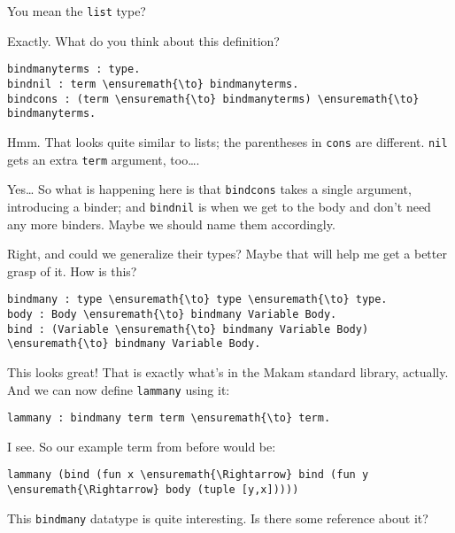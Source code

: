 \heroSTUDENT{} You mean the \texttt{list} type?

\heroADVISOR{} Exactly. What do you think about this definition?

\begin{verbatim}
bindmanyterms : type.
bindnil : term \ensuremath{\to} bindmanyterms.
bindcons : (term \ensuremath{\to} bindmanyterms) \ensuremath{\to} bindmanyterms.
\end{verbatim}

\heroSTUDENT{} Hmm. That looks quite similar to lists; the parentheses in
\texttt{cons} are different. \texttt{nil} gets an extra \texttt{term}
argument, too\ldots{}.

\heroADVISOR{} Yes\ldots{} So what is happening here is that \texttt{bindcons}
takes a single argument, introducing a binder; and \texttt{bindnil} is
when we get to the body and don't need any more binders. Maybe we should
name them accordingly.

\heroSTUDENT{} Right, and could we generalize their types? Maybe that will
help me get a better grasp of it. How is this?

\importantCodeblock{}

\begin{verbatim}
bindmany : type \ensuremath{\to} type \ensuremath{\to} type.
body : Body \ensuremath{\to} bindmany Variable Body.
bind : (Variable \ensuremath{\to} bindmany Variable Body) \ensuremath{\to} bindmany Variable Body.
\end{verbatim}

\importantCodeblockEnd{}

\heroADVISOR{} This looks great! That is exactly what's in the Makam standard
library, actually. And we can now define \texttt{lammany} using it:

\importantCodeblock{}

\begin{verbatim}
lammany : bindmany term term \ensuremath{\to} term.
\end{verbatim}

\importantCodeblockEnd{}

\heroSTUDENT{} I see. So our example term from before would be:

\begin{verbatim}
lammany (bind (fun x \ensuremath{\Rightarrow} bind (fun y \ensuremath{\Rightarrow} body (tuple [y,x]))))
\end{verbatim}

\noindent
This \texttt{bindmany} datatype is quite interesting. Is there some
reference about it?

